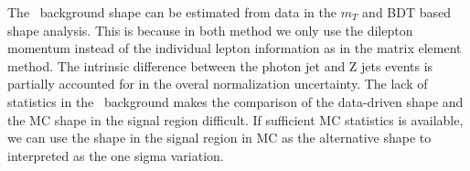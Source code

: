 The \dyll\  background shape can be estimated from data in the $m_T$ and BDT based 
shape analysis. This is because in both method we only use the dilepton momentum 
instead of the individual lepton information as in the matrix element method. 
The intrinsic difference between the photon jet and Z jets events is partially
accounted for in the overal normalization uncertainty. 
The lack of statistics in the \dyll\  background makes the comparison of the 
data-driven shape and the MC shape in the signal region difficult. 
If sufficient MC statistics is available, we can use the shape in the signal region in MC as 
the alternative shape to interpreted as the one sigma variation. 




